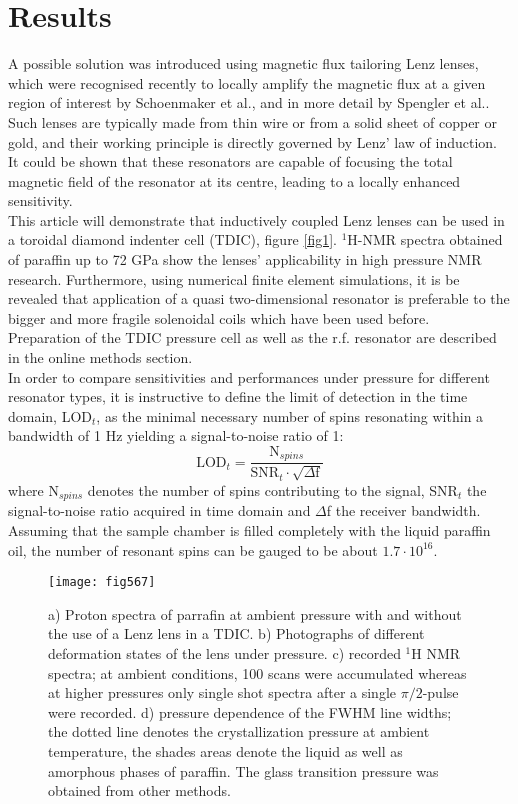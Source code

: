 \documentclass[aip,rsi,reprint,graphicx]{revtex4-1} %
\begin{document}
\section{Results}
A possible solution was introduced using magnetic flux tailoring Lenz lenses, which were recognised recently to locally amplify the magnetic flux at a given region of interest by Schoenmaker et al.\cite{Schoenmaker2013}, and in more detail by Spengler et al.\cite{Spengler2016}.  Such lenses are typically made from thin wire or from a solid sheet of copper or gold, and their working principle is directly governed by Lenz' law of induction. It could be shown that these resonators are capable of focusing the total magnetic field of the resonator at its centre, leading to a locally enhanced sensitivity.\\
This article will demonstrate that inductively coupled Lenz lenses can be used in a 
toroidal diamond indenter cell (TDIC), figure \ref{fig1}. $^1$H-NMR spectra obtained of paraffin  up to 72 GPa show the lenses' applicability in high pressure NMR research. Furthermore, using numerical finite element simulations, it is be revealed that application of a quasi two-dimensional resonator is preferable to the bigger and more fragile solenoidal coils which have been used before.\\
Preparation of the TDIC pressure cell as well as the r.f. resonator are described in the online methods section.\\
In order to compare sensitivities and performances under pressure for different resonator types, it is instructive to define the limit of detection in the time domain, LOD$_t$, as the minimal necessary number of spins resonating within a bandwidth of 1 Hz yielding a signal-to-noise ratio of 1\cite{Ryan2012}:
\begin{equation}
\text{LOD}_t=\frac{\text{N}_{spins}}{\text{SNR}_t\cdot \sqrt{\Delta \text{f}}}
\label{LOD}
\end{equation}
where N$_{spins}$ denotes the number of spins contributing to the signal, SNR$_t$ the signal-to-noise ratio acquired in time domain and $\Delta$f the receiver bandwidth. Assuming that the sample chamber is filled completely with the liquid paraffin oil, the number of resonant spins can be gauged to be about $1.7\cdot 10^{16}$. 
 \begin{figure*}
  \texttt{[image: fig567]}%
 \caption{a) Proton spectra of parrafin at ambient pressure with and without the use of a Lenz lens in a TDIC. b) Photographs of different deformation states of the lens under pressure. c) recorded $^1$H NMR spectra; at ambient conditions, 100 scans were accumulated whereas at higher pressures only single shot spectra after a single $\pi /2$-pulse were recorded. d) pressure dependence of the FWHM line widths; the dotted line denotes the crystallization pressure at ambient temperature, the shades areas denote the liquid as well as amorphous phases of paraffin. The glass transition pressure was obtained from other methods.\label{fig567}}%
 \end{figure*}
\end{document}
